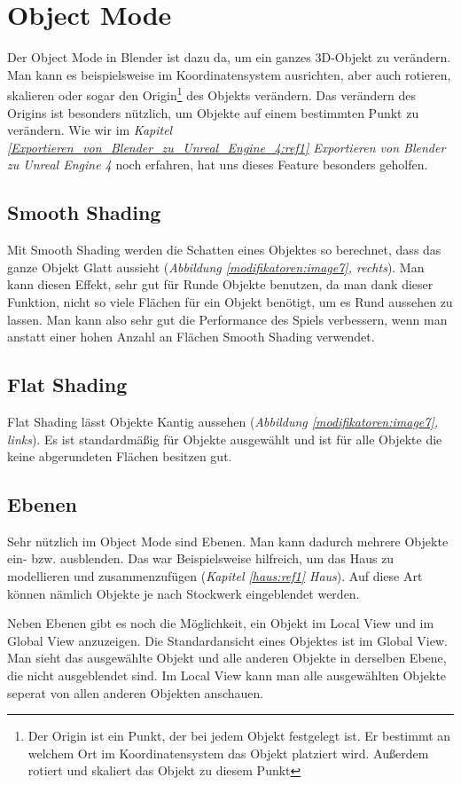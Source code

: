\section{Object Mode}
Der Object Mode in Blender ist dazu da, um ein ganzes 3D-Objekt zu verändern. Man kann es beispielsweise im Koordinatensystem ausrichten, aber
auch rotieren, skalieren oder sogar den Origin\footnote{Der Origin ist ein Punkt, der bei jedem Objekt festgelegt ist. Er bestimmt an welchem Ort im Koordinatensystem das Objekt platziert wird. Außerdem rotiert und skaliert das Objekt zu diesem Punkt}
des Objekts verändern. Das verändern des Origins ist besonders nützlich, um Objekte auf einem bestimmten Punkt zu verändern.
Wie wir im \textit{Kapitel \ref{Exportieren_von_Blender_zu_Unreal_Engine_4:ref1} \dq{} Exportieren von Blender zu Unreal Engine 4\dq} noch erfahren, hat uns dieses Feature besonders geholfen.

\subsection{Smooth Shading}
\label{objectMode:smoothshading}
Mit Smooth Shading werden die Schatten eines Objektes so berechnet, dass das ganze Objekt Glatt aussieht (\textit{Abbildung \ref{modifikatoren:image7}, rechts}).
Man kann diesen Effekt, sehr gut für Runde Objekte benutzen, da man dank dieser Funktion, nicht so viele Flächen für ein Objekt benötigt, um
es Rund aussehen zu lassen. Man kann also sehr gut die Performance des Spiels verbessern, wenn man anstatt einer hohen Anzahl an Flächen Smooth Shading verwendet.

\subsection{Flat Shading}
Flat Shading lässt Objekte Kantig aussehen (\textit{Abbildung \ref{modifikatoren:image7}, links}).
Es ist standardmäßig für Objekte ausgewählt und ist für alle Objekte die keine abgerundeten Flächen besitzen gut.

\subsection{Ebenen}
Sehr nützlich im Object Mode sind Ebenen. Man kann dadurch mehrere Objekte ein- bzw. ausblenden.
Das war Beispielsweise hilfreich, um das Haus zu modellieren und zusammenzufügen (\textit{Kapitel \ref{haus:ref1} \dq Haus\dq}).
Auf diese Art können nämlich Objekte je nach Stockwerk eingeblendet werden.

Neben Ebenen gibt es noch die Möglichkeit, ein Objekt im Local View und im Global View anzuzeigen.
Die Standardansicht eines Objektes ist im Global View. Man sieht das ausgewählte Objekt und alle anderen Objekte in derselben Ebene, die nicht ausgeblendet sind.
Im Local View kann man alle ausgewählten Objekte seperat von allen anderen Objekten anschauen.
